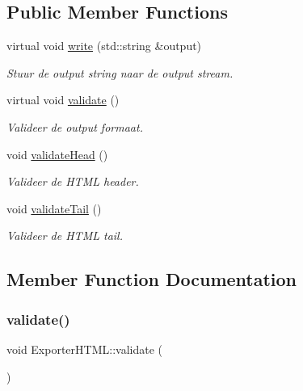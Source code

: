 \subsection*{Public Member Functions}
\begin{DoxyCompactItemize}
\item 
virtual void \hyperlink{class_exporter_h_t_m_l_aa5b12621501f09a9a082e9337fbf943c}{write} (std\+::string \&output)
\begin{DoxyCompactList}\small\item\em Stuur de output string naar de output stream. \end{DoxyCompactList}\item 
virtual void \hyperlink{class_exporter_h_t_m_l_a60518b938e3cddd92ce3218de3651ac4}{validate} ()
\begin{DoxyCompactList}\small\item\em Valideer de output formaat. \end{DoxyCompactList}\item 
void \hyperlink{class_exporter_h_t_m_l_a2d9bb5e5f68a9e6111d8a929eb4a042e}{validate\+Head} ()
\begin{DoxyCompactList}\small\item\em Valideer de H\+T\+ML header. \end{DoxyCompactList}\item 
void \hyperlink{class_exporter_h_t_m_l_ab9d3ebcfa054f02f08ab34e1a6298963}{validate\+Tail} ()
\begin{DoxyCompactList}\small\item\em Valideer de H\+T\+ML tail. \end{DoxyCompactList}\end{DoxyCompactItemize}


\subsection{Member Function Documentation}
\mbox{\label{class_exporter_h_t_m_l_a60518b938e3cddd92ce3218de3651ac4}} 
\subsubsection{\texorpdfstring{validate()}{validate()}}
{\footnotesize\ttfamily void Exporter\+H\+T\+M\+L\+::validate (\begin{DoxyParamCaption}{ }\end{DoxyParamCaption})\hspace{0.3cm}{\ttfamily [virtual]}}



